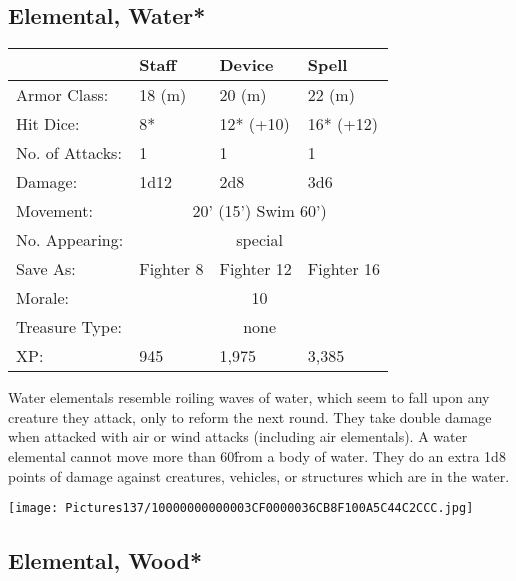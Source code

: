 \documentclass[a4paper,twoside,openany,10pt]{book}
\begin{document}
\begin{multicols}{2}
\subsection*{Elemental, Water*}\label{elemental-water}

\begin{tabularx}{0.48\textwidth}{@{}lllX@{}}
& Staff & Device & Spell \\\hline
Armor Class: & 18 (m) & 20 (m) & 22 (m) \\\hline
Hit Dice: & 8* & 12* (+10) & 16* (+12) \\\hline
No. of Attacks: & 1 & 1 & 1 \\\hline
Damage: & 1d12 & 2d8 & 3d6 \\\hline
Movement:  & \multicolumn{3}{c}{20' (15') Swim 60')}\\\hline
No. Appearing: &\multicolumn{3}{c}{special} \\\hline
Save As: & Fighter 8 & Fighter 12 & Fighter 16 \\\hline
Morale: & \multicolumn{3}{c}{10} \\\hline
Treasure Type: & \multicolumn{3}{c}{none} \\\hline
XP: & 945 & 1,975 & 3,385 \\\hline
\end{tabularx}\medskip

Water elementals resemble roiling waves of water, which seem to fall upon any creature they attack, only to reform the next round. They take double damage when attacked with air or wind attacks (including air elementals). A water elemental cannot move more than 60\' from a body of water. They do an extra 1d8 points of damage against creatures, vehicles, or structures which are in the water.


\begin{center}
	\texttt{[image: Pictures137/10000000000003CF0000036CB8F100A5C44C2CCC.jpg]}
\end{center}

\columnbreak

\subsection*{Elemental, Wood*}\label{elemental-wood}


\end{multicols}
\end{document}
